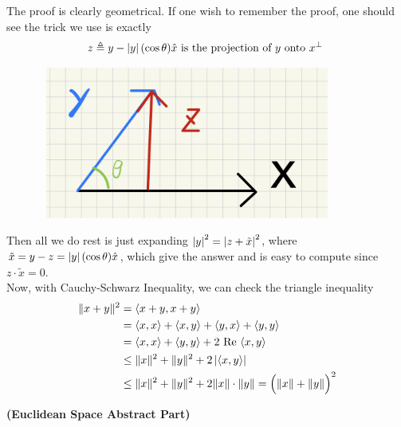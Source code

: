 \documentclass{report}
\begin{document}
\begin{mdframed}
The proof is clearly geometrical. If one wish to remember the proof, one should see the trick we use is exactly 
\begin{align*}
z\triangleq y-\left|y\right|(\cos \theta )\hat{x}\text{ is the projection of $y$ onto $x^{\perp}$ }
\end{align*}
\begin{center}
   \begin{minipage}{0.9\linewidth}  
       \centering
       \includegraphics[height=5cm,width=12cm]{CSp.jpeg}
   \end{minipage}
\end{center}
Then all we do rest is just expanding $\left|y\right|^2=\left|z+\tilde{x}\right|^2$, where $\tilde{x}=y-z=\left|y\right|(\cos \theta)\hat{x}$, which give the answer and is easy to compute since $z\cdot \tilde{x}=0$.\\

Now, with Cauchy-Schwarz Inequality, we can check the triangle inequality 
\begin{align*}
  \| x+y \|^2&=\langle x+y,x+y\rangle \\
&=\langle x,x\rangle +\langle x,y\rangle +\langle y,x\rangle +\langle y,y\rangle \\
&= \langle x,x\rangle + \langle y,y\rangle +2\text{ Re }\langle x,y\rangle \\
&\leq \| x \|^2 + \| y \|^2 + 2\left|\langle x,y\rangle \right|\\
&\leq \| x \|^2 + \| y \|^2 + 2\| x \|\cdot \| y \|=\Big(\| x \|+\| y \|\Big)^2
\end{align*}
\end{mdframed}
\textbf{(Euclidean Space Abstract Part)} 
\end{document}
